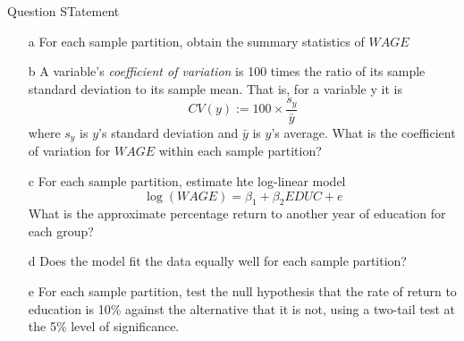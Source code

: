 \documentclass[xcolor={dvipsnames}]{beamer}
\begin{document}
	
\begin{frame}[allowframebreaks]{5.15}
	Question STatement
	
	\begin{itemize}
		\item[a] For each sample partition, obtain the summary statistics of $WAGE$

	

	\item[b] A variable's \textit{coefficient of variation} is 100 times the ratio of its sample standard deviation to its sample mean. That is, for a variable y it is $$CV(y):= 100 \times \frac{s_y}{\bar{y}}$$ where $s_y$ is $y$'s standard deviation and $\bar{y}$ is $y$'s average. What is the coefficient of variation for $WAGE$ within each sample partition?
	
	\item[c] For each sample partition, estimate hte log-linear model $$\log(WAGE) = \beta_1 + \beta_2 EDUC + e$$ What is the approximate percentage return to another year of education for each group?
	
	\item[d] Does the model fit the data equally well for each sample partition?
	
	\item[e] For each sample partition, test the null hypothesis that the rate of return to education is 10\% against the alternative that it is not, using a two-tail test at the 5\% level of significance.
\end{itemize}

\end{frame}
\end{document}
